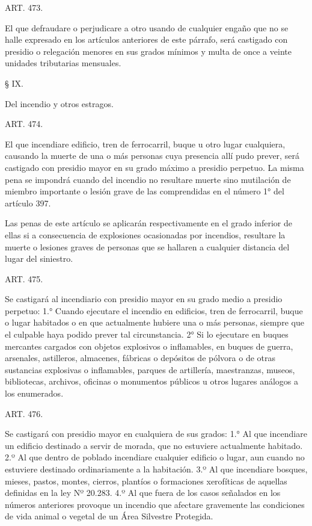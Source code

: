     ART. 473.

    El que defraudare o perjudicare a otro usando de cualquier engaño que no se halle expresado en los artículos anteriores de este párrafo, será castigado con presidio o relegación menores en sus grados mínimos y multa de once a veinte unidades tributarias mensuales.








    § IX.

    Del incendio y otros estragos.





    ART. 474.

    El que incendiare edificio, tren de ferrocarril, buque u otro lugar cualquiera, causando la muerte de una o más personas cuya presencia allí pudo prever, será castigado con presidio mayor en su grado máximo a presidio perpetuo.
    La misma pena se impondrá cuando del incendio no resultare muerte sino mutilación de miembro importante o lesión grave de las comprendidas en el número 1° del artículo 397.

    Las penas de este artículo se aplicarán respectivamente en el grado inferior de ellas si a consecuencia de explosiones ocasionadas por incendios, resultare la muerte o lesiones graves de personas que se hallaren a cualquier distancia del lugar del siniestro.




    ART. 475.

    Se castigará al incendiario con presidio mayor en su grado medio a presidio perpetuo:
    1.° Cuando ejecutare el incendio en edificios, tren de ferrocarril, buque o lugar habitados o en que actualmente hubiere una o más personas, siempre que el culpable haya podido prever tal circunstancia.
    2° Si lo ejecutare en buques mercantes cargados con objetos explosivos o inflamables, en buques de guerra, arsenales, astilleros, almacenes, fábricas o depósitos de pólvora o de otras sustancias explosivas o inflamables, parques de artillería, maestranzas, museos, bibliotecas, archivos, oficinas o monumentos públicos u otros lugares análogos a los enumerados.



    ART. 476.

    Se castigará con presidio mayor en cualquiera de sus grados:
    1.° Al que incendiare un edificio destinado a servir de morada, que no estuviere actualmente habitado.
    2.º Al que dentro de poblado incendiare cualquier edificio o lugar, aun cuando no estuviere destinado ordinariamente a la habitación.
    3.º Al que incendiare bosques, mieses, pastos, montes, cierros, plantíos o formaciones xerofíticas de aquellas definidas en la ley Nº 20.283.
    4.º Al que fuera de los casos señalados en los números anteriores provoque un incendio que afectare gravemente las condiciones de vida animal o vegetal de un Área Silvestre Protegida.


